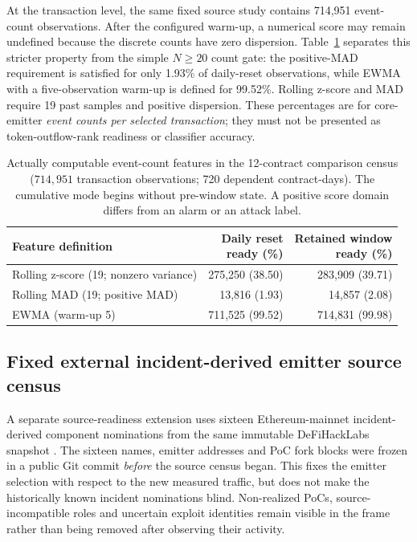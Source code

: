 \documentclass[preprint,12pt,authoryear]{elsarticle}
\begin{document}
At the transaction level, the same fixed source study contains 714,951 event-count observations. After the configured warm-up, a numerical score may remain undefined because the discrete counts have zero dispersion. Table~\ref{tab:runtime} separates this stricter property from the simple $N\geq20$ count gate: the positive-MAD requirement is satisfied for only 1.93\% of daily-reset observations, while EWMA with a five-observation warm-up is defined for 99.52\%. Rolling z-score and MAD require 19 past samples and positive dispersion. These percentages are for core-emitter \emph{event counts per selected transaction}; they must not be presented as token-outflow-rank readiness or classifier accuracy.

\begin{table}[htbp]
\centering\small
\caption{Actually computable event-count features in the 12-contract comparison census ($714{,}951$ transaction observations; 720 dependent contract-days). The cumulative mode begins without pre-window state. A positive score domain differs from an alarm or an attack label.}
\label{tab:runtime}
\begin{tabularx}{\linewidth}{@{}>{\raggedright\arraybackslash}X r r@{}}
\toprule
Feature definition & \shortstack{Daily reset\\ready (\%)} & \shortstack{Retained window\\ready (\%)}\\
\midrule
Rolling z-score (19; nonzero variance) & 275,250 (38.50) & 283,909 (39.71)\\
Rolling MAD (19; positive MAD) & 13,816 (1.93) & 14,857 (2.08)\\
EWMA (warm-up 5) & 711,525 (99.52) & 714,831 (99.98)\\
\bottomrule
\end{tabularx}
\end{table}

\subsection{Fixed external incident-derived emitter source census}
A separate source-readiness extension uses sixteen Ethereum-mainnet incident-derived component nominations from the same immutable DeFiHackLabs snapshot \citep{DeFiHackLabs2026}. The sixteen names, emitter addresses and PoC fork blocks were frozen in a public Git commit \emph{before} the source census began. This fixes the emitter selection with respect to the new measured traffic, but does not make the historically known incident nominations blind. Non-realized PoCs, source-incompatible roles and uncertain exploit identities remain visible in the frame rather than being removed after observing their activity.
\end{document}
